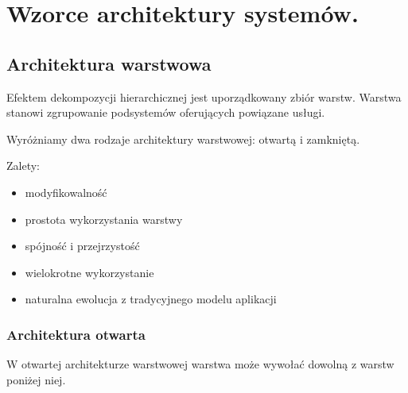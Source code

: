 \documentclass[12pt]{article}
\begin{document}
   \section{Wzorce architektury systemów.}

        \subsection{Architektura warstwowa}

        Efektem dekompozycji hierarchicznej jest
        uporządkowany zbiór warstw. Warstwa stanowi
        zgrupowanie podsystemów oferujących
        powiązane usługi.

        Wyróżniamy dwa rodzaje architektury warstwowej:
        otwartą i zamkniętą.

        Zalety:
        \begin{itemize}
            \item modyfikowalność
            \item prostota wykorzystania warstwy
            \item spójność i przejrzystość
            \item wielokrotne wykorzystanie
            \item naturalna ewolucja z tradycyjnego modelu aplikacji
        \end{itemize}
        
            \subsubsection{Architektura otwarta}
            
            W otwartej architekturze warstwowej warstwa może wywołać
            dowolną z warstw poniżej niej.
\end{document}
